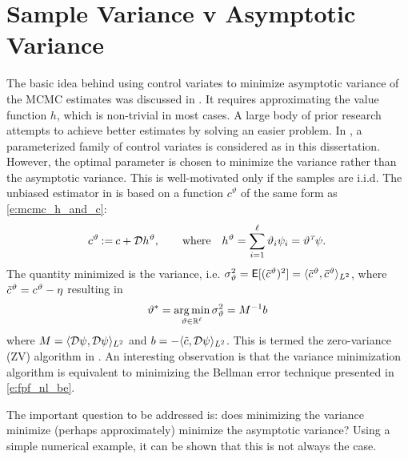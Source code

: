 \section{Sample Variance v Asymptotic Variance}
\label{s:mcmc_var_vs_asym_var}
The basic idea behind using control variates to minimize asymptotic variance of the MCMC estimates was discussed in . It requires approximating the value function $h$, which is non-trivial in most cases. A large body of prior research \cite{mirsolimp13, oatgircho,papmirgir14} attempts to achieve better estimates by solving an easier problem. In \cite{papmirgir14}, a parameterized family of control variates is considered as in this dissertation. However, the optimal parameter is chosen to minimize the variance rather than the asymptotic variance. This is well-motivated only  if the samples are i.i.d. 
The unbiased estimator in \cite{papmirgir14} is based on a function $c^{\vartheta}$ of the same form as \eqref{e:mcmc_h_and_c}:
\[
\begin{aligned}
c^\vartheta  \mathbin{:=} c + {\cal D} h^\vartheta,
\qquad
\text{where}
\quad
h^\vartheta  =  \sum_{i=1}^\ell \vartheta_i \psi_i = \vartheta^{\hbox{\tiny\it T}} \psi.\,
\end{aligned}
\]
The quantity minimized is the variance, i.e. $\sigma^2_{\vartheta} = {\sf E}[(\tilde c^\vartheta)^2] = \langle \tilde c^\vartheta, \tilde c^\vartheta \rangle_{L^2}$, where $\tilde c^\vartheta = c^\vartheta - \eta$ resulting in
\begin{equation}
\vartheta^*= \argmin_{\vartheta \in \Re^\ell} \sigma^2_\vartheta  = M^{-1} b
\label{e:mcmc_var_theta_star}
\end{equation}
where $M = \langle {\cal D} \psi,  {\cal D} \psi \rangle_{L^2}$ and $b = - \langle \tilde c, {\cal D} \psi \rangle_{L^2}$. This is termed the zero-variance (ZV) algorithm in \cite{papmirgir14}. An interesting observation is that the variance minimization algorithm is equivalent to minimizing the Bellman error technique presented in \eqref{e:fpf_nl_be}.

The important question to be addressed is: does minimizing the variance minimize (perhaps approximately) minimize the asymptotic variance? Using a simple numerical example, it can be shown that this is not always the case.

